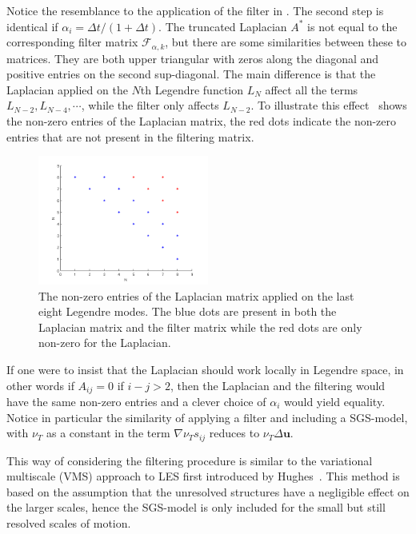 Notice the resemblance to the application of the filter in . The second step
is identical if $\alpha_i = \Delta t/(1+\Delta t)$. The truncated Laplacian $A^*$ is not equal to the corresponding
filter matrix $\mathcal{F}_{\alpha,k}$, but there are some similarities between these to matrices.
They are both upper triangular with zeros along the diagonal and positive entries on the second 
sup-diagonal. The main difference is that the Laplacian applied on the $N$th Legendre function 
$L_N$ affect all the terms $L_{N-2},L_{N-4},\cdots$, while the filter only affects $L_{N-2}$.
To illustrate this effect~ shows the non-zero entries of the
Laplacian matrix, the red dots indicate the non-zero entries that are not present in the filtering
matrix.
%
\begin{figure}[h]
	\centering
	\includegraphics[width=0.5\textwidth]{Figures/matrix.png}
	\caption{The non-zero entries of the Laplacian matrix applied on the last eight Legendre modes.
    The blue dots are present in both the Laplacian matrix and the filter matrix
    while the red dots are only non-zero for the Laplacian.}
	\label{fig:entries}
\end{figure}
%
If one were to insist that the Laplacian should work locally in Legendre space, in other words 
if $A_{ij}=0$ if $i-j>2$, then the Laplacian and the filtering would have the same non-zero entries 
and a clever choice of $\alpha_i$ would yield equality. Notice in particular the similarity of 
applying a filter and including a SGS-model, with $\nu_T$ as a constant in  the term 
$\nabla \nu_Ts_{ij}$ reduces to $\nu_T\Delta \mathbf{u}$.

This way of considering the filtering procedure is similar to the variational multiscale (VMS) 
approach to LES first introduced by Hughes~\cite{Hughes}. This method is based on the assumption that
the unresolved structures have a negligible effect on the larger scales, hence the SGS-model is 
only included for the small but still resolved scales of motion.

